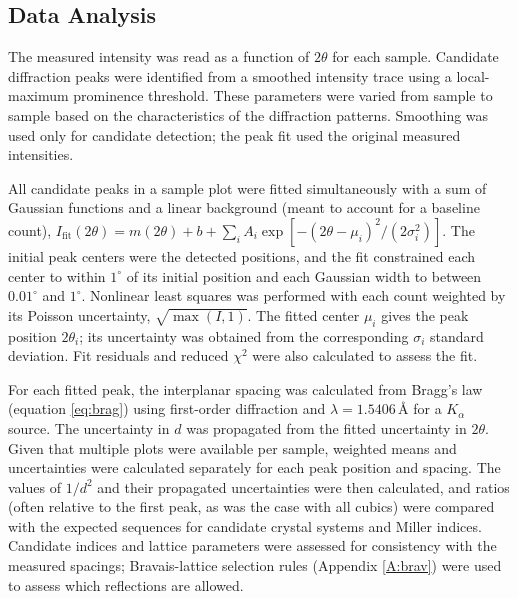 \documentclass[12pt]{article}
\begin{document}

\subsection{Data Analysis}
\label{subsec:6.1}
The measured intensity was read as a function of $2\theta$ for each sample. Candidate diffraction
peaks were identified from a smoothed intensity trace using a local-maximum
prominence threshold. These parameters were varied from sample to sample based on the characteristics
of the diffraction patterns. Smoothing was used only
for candidate detection; the peak fit used the original measured intensities.

All candidate peaks in a sample plot were fitted simultaneously with a sum of Gaussian functions and
a linear background (meant to account for a baseline count), $I_{\mathrm{fit}}(2\theta)=m(2\theta)+b+
\sum_i A_i\exp[-(2\theta-\mu_i)^2/(2\sigma_i^2)]$. The initial peak centers were the
detected positions, and the fit constrained each center to within $1^\circ$ of its initial
position and each Gaussian width to between $0.01^\circ$ and $1^\circ$. Nonlinear least
squares was performed with each count weighted by its Poisson uncertainty,
$\sqrt{\max(I,1)}$. The fitted center $\mu_i$ gives the peak position $2\theta_i$; its
uncertainty was obtained from the corresponding $\sigma_i$ standard deviation. Fit residuals
and reduced $\chi^2$ were also calculated to assess the fit.

For each fitted peak, the interplanar spacing was calculated from Bragg's law
(equation \ref{eq:brag}) using first-order diffraction and
$\lambda=1.5406\,\text{\AA}$ for a $K_\alpha$ source. The uncertainty in $d$ was propagated from the fitted
uncertainty in $2\theta$. Given that multiple plots were available per sample, weighted means and uncertainties were
calculated separately for each peak position and spacing. The values of $1/d^2$ and their
propagated uncertainties were then calculated, and ratios (often relative to the first peak, as was the case with all cubics) were
compared with the expected sequences for candidate crystal systems and Miller indices.
Candidate indices and lattice parameters were assessed for consistency with the measured
spacings; Bravais-lattice selection rules (Appendix \ref{A:brav}) were used to assess which
reflections are allowed.
\end{document}
